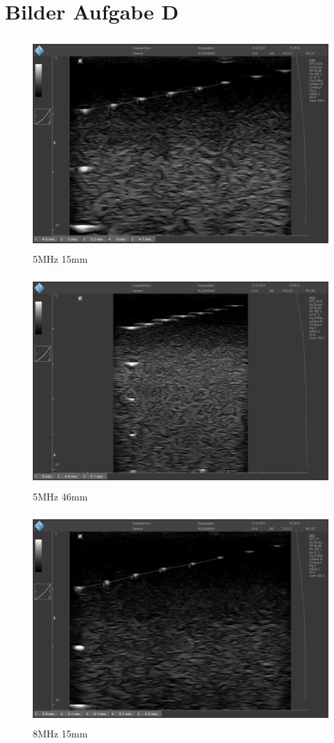 \documentclass[11pt]{scrartcl}
\begin{document}
    \section{Bilder Aufgabe D}

    \begin{figure}[H]
        \centering
        \includegraphics[height=8cm]{images/D_5_15_e}
        \caption{5MHz 15mm}
        \label{fig:D_5_15}
    \end{figure}

    \begin{figure}[H]
        \centering
        \includegraphics[height=8cm]{images/D_5_46_e}
        \caption{5MHz 46mm}
        \label{fig:D_5_46}
    \end{figure}

    \begin{figure}[H]
        \centering
        \includegraphics[height=8cm]{images/D_8_15_e}
        \caption{8MHz 15mm}
        \label{fig:D_8_15}
    \end{figure}
\end{document}
